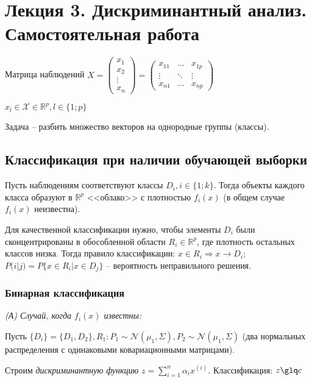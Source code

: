 \documentclass[main.tex]{subfiles}
\begin{document}
\section{Лекция 3. Дискриминантный анализ. Самостоятельная работа}

Матрица наблюдений $ X = \begin{pmatrix} x_1 \\ x_2 \\ \vdots \\ x_n \end{pmatrix}
= \begin{pmatrix}
x_{11} & \dots & x_{1p} \\
\vdots & \ddots & \vdots \\
x_{n1} & \dots & x_{np}
\end{pmatrix} $

$ x_l \in \mathcal{X} \in \mathds{R}^p, l \in \{1;p\} $

Задача -- разбить множество векторов на однородные группы (классы).

\subsection{Классификация при наличии обучающей выборки}

Пусть наблюдениям соответствуют классы $ D_i, i \in \{1;k\} $.
Тогда объекты каждого класса образуют в $ \mathds{R}^p $ <<облако>> с плотностью $ f_i(x) $ (в общем случае $ f_i(x) $ неизвестна).

Для качественной классификации нужно, чтобы элементы $ D_i $ были сконцентрированы в обособленной области $ R_i \in \mathds{R}^p $, где плотность остальных классов низка.
Тогда правило классификации: $ x \in R_i \Rightarrow x \to D_i$; $ P(i|j) = P\{x \in R_i | x \in D_j \} $ -- вероятность неправильного решения.


\subsubsection{Бинарная классификация}

\emph{(А) Случай, когда $f_i(x)$ известны:}

Пусть $ \{D_i\} = \{D_1, D_2\}, R_1 : P_1 \sim \mathcal{N}\left(\mu_1, \Sigma \right), P_2 \sim \mathcal{N}\left(\mu_1, \Sigma \right) $ (два нормальных распределения с одинаковыми ковариационными матрицами).

Строим \emph{дискриминантную функцию} $ z = \sum_{i=1}^{n} \alpha_i x^{(i)} $.
Классификация: $ z \glq c $
\end{document}
